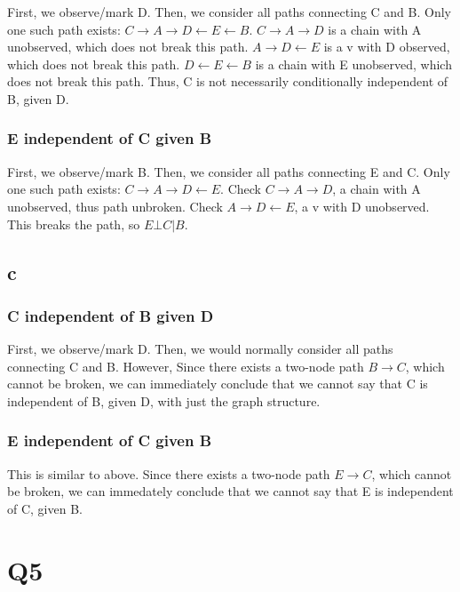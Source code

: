 \documentclass{article}
\begin{document}
First, we observe/mark D. Then, we consider all paths connecting C and B. Only one 
such path exists: $ C \rightarrow A \rightarrow D \leftarrow E \leftarrow B $. 
$ C \rightarrow A \rightarrow D $ is a chain with A unobserved, which does not break this path.
$ A \rightarrow D \leftarrow E $ is a v with D observed, which does not break this path. 
$ D \leftarrow E \leftarrow B $ is a chain with E unobserved, which does not break this path.
Thus, C is not necessarily conditionally independent of B, given D.

\subsubsection{E independent of C given B}

First, we observe/mark B. Then, we consider all paths connecting E and C. Only one 
such path exists: $ C \rightarrow A \rightarrow D \leftarrow E $. 
Check $ C \rightarrow A \rightarrow D $, a chain with A unobserved, thus path unbroken.
Check $ A \rightarrow D \leftarrow E $, a v with D unobserved. This breaks the path, so 
$ E \bot C | B $.

\subsection{c}

\subsubsection{C independent of B given D}

First, we observe/mark D. Then, we would normally consider all paths connecting 
C and B. However, Since there exists a two-node path $ B \rightarrow C $, which 
cannot be broken, we can immediately conclude that we cannot say that C is 
independent of B, given D, with just the graph structure.

\subsubsection{E independent of C given B}

This is similar to above. Since there exists a two-node path $ E \rightarrow C $, 
which cannot be broken, we can immedately conclude that we cannot say that E is 
independent of C, given B.

\section{Q5}
\end{document}
